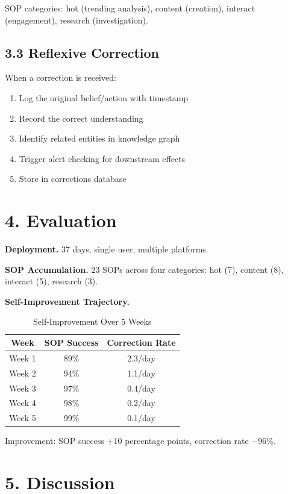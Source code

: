 \documentclass[11pt,a4paper]{article}
\begin{document}
SOP categories: hot (trending analysis), content (creation), interact (engagement), research (investigation).

\subsection{3.3 Reflexive Correction}

When a correction is received:

\begin{enumerate}
\item Log the original belief/action with timestamp
\item Record the correct understanding
\item Identify related entities in knowledge graph
\item Trigger alert checking for downstream effects
\item Store in corrections database
\end{enumerate}

\section{4. Evaluation}

\textbf{Deployment.} 37 days, single user, multiple platforms.

\textbf{SOP Accumulation.} 23 SOPs across four categories: hot (7), content (8), interact (5), research (3).

\textbf{Self-Improvement Trajectory.}

\begin{table}[h]
\centering
\caption{Self-Improvement Over 5 Weeks}
\begin{tabular}{|c|c|c|}
\hline
\textbf{Week} & \textbf{SOP Success} & \textbf{Correction Rate} \\
\hline
Week 1 & 89\% & 2.3/day \\
Week 2 & 94\% & 1.1/day \\
Week 3 & 97\% & 0.4/day \\
Week 4 & 98\% & 0.2/day \\
Week 5 & 99\% & 0.1/day \\
\hline
\end{tabular}
\end{table}

Improvement: SOP success +10 percentage points, correction rate $-$96\%.

\section{5. Discussion}
\end{document}
